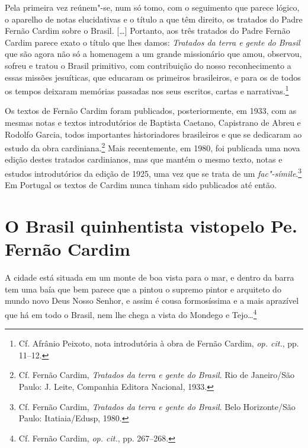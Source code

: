 \begin{hedraquote}
Pela primeira vez reúnem"-se, num só tomo, com o seguimento
que parece lógico, o aparelho de notas elucidativas e o título a que
têm direito, os tratados do Padre Fernão Cardim sobre o Brasil. [\ldots]
Portanto, aos três tratados do Padre Fernão Cardim parece exato o
título que lhes damos: \textit{Tratados da terra e gente do Brasil} 
que são agora não só a homenagem a um grande missionário que
amou, observou, sofreu e tratou o Brasil primitivo, com contribuição do
nosso reconhecimento a essas missões jesuíticas, que educaram os
primeiros brasileiros, e para os de todos os tempos deixaram memórias
passadas nos seus escritos, cartas e narrativas.\footnote{ Cf. Afrânio Peixoto, 
nota introdutória à obra de Fernão Cardim, \textit{op. cit.}, pp. 11--12.} 
\end{hedraquote}

 Os textos de Fernão Cardim foram publicados, posteriormente,
em 1933, com as mesmas notas e textos introdutórios de Baptista
Caetano, Capistrano de Abreu e Rodolfo Garcia, todos importantes
historiadores brasileiros e que se dedicaram ao estudo da obra
cardiniana.\footnote{ Cf. Fernão Cardim, \textit{Tratados da terra
e gente do Brasil}. Rio de Janeiro/São Paulo: J. Leite, Companhia
Editora Nacional, 1933.} Mais recentemente, em 1980, foi publicada uma nova
edição destes tratados cardinianos, mas que mantém o mesmo
texto, notas e estudos introdutórios da edição de 1925, uma vez que se
trata de um \textit{fac"-símile}.\footnote{ Cf. Fernão Cardim, \textit{Tratados
da terra e gente do Brasil}. Belo Horizonte/São Paulo: Itatiaia/Edusp, 1980.} 
Em Portugal os textos de Cardim nunca tinham sido publicados até então.

\section{O Brasil quinhentista visto\break pelo Pe. Fernão Cardim}

\begin{hedraquote}
A cidade está situada em um monte de boa vista para o mar,
e dentro da barra tem uma baía que bem parece que a pintou o supremo
pintor e arquiteto do mundo novo Deus Nosso Senhor, e assim é cousa
formosíssima e a mais aprazível que há em todo o Brasil, nem lhe chega
a vista do Mondego e Tejo\ldots\footnote{ Cf. Fernão Cardim,
\textit{op. cit.}, pp. 267--268.}
\end{hedraquote}
 

